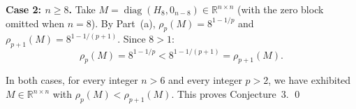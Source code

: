 \textbf{Case 2: $n \geq 8$.} Take $M = \operatorname{diag}(H_8, 0_{n-8}) \in \mathbb{R}^{n\times n}$ (with the zero block omitted when $n = 8$). By Part~(a), $\rho_p(M) = 8^{1-1/p}$ and $\rho_{p+1}(M) = 8^{1-1/(p+1)}$. Since $8 > 1$:
\[
\rho_p(M) = 8^{1-1/p} < 8^{1-1/(p+1)} = \rho_{p+1}(M).
\]

\medskip

In both cases, for every integer $n > 6$ and every integer $p > 2$, we have exhibited $M \in \mathbb{R}^{n\times n}$ with $\rho_p(M) < \rho_{p+1}(M)$. This proves Conjecture~3. \qed

